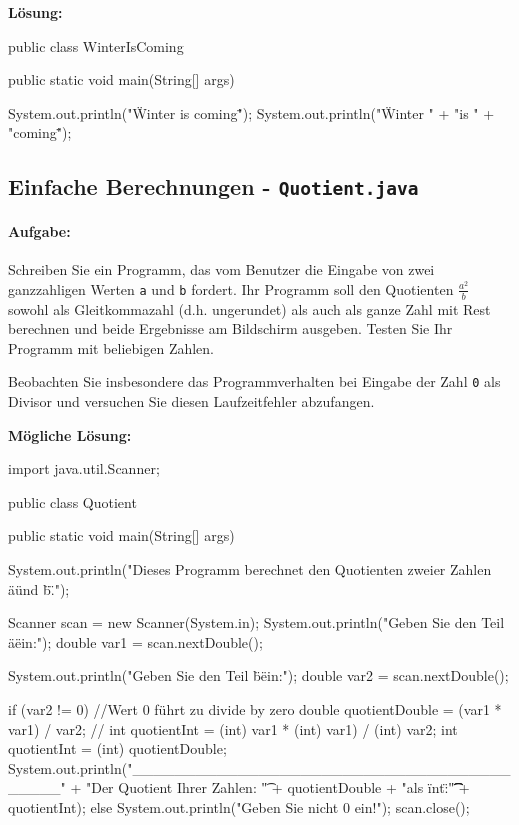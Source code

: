 \documentclass[a4paper,10pt, dvipsnames]{report}
\begin{document}
\textbf{Lösung:}
\begin{javacodebox}
public class WinterIsComing {

    public static void main(String[] args) {

        System.out.println("\"Winter is coming\"");
        System.out.println("\"Winter \n" +
            "is \n" +
            "coming\"");
    }
}
\end{javacodebox}


\subsection{Einfache Berechnungen - \texttt{Quotient.java}}

\paragraph{Aufgabe:}
Schreiben Sie ein Programm, das vom Benutzer die Eingabe von zwei ganzzahligen Werten \texttt{a} und \texttt{b} fordert. Ihr Programm soll den Quotienten $\frac{a^2}{b}$ sowohl als Gleitkommazahl (d.h. ungerundet) als auch als ganze Zahl mit Rest berechnen und beide Ergebnisse am Bildschirm ausgeben. Testen Sie Ihr Programm mit beliebigen Zahlen.

Beobachten Sie insbesondere das Programmverhalten bei Eingabe der Zahl \texttt{0} als Divisor und versuchen Sie diesen Laufzeitfehler abzufangen.

\textbf{Mögliche Lösung:}

\begin{javacodebox}
import java.util.Scanner;

public class Quotient {
    public static void main(String[] args) {

        System.out.println("Dieses Programm berechnet den Quotienten
                            zweier Zahlen \"a\" und \"b\".");
        
        Scanner scan = new Scanner(System.in);
        System.out.println("Geben Sie den Teil \"a\" ein:");
        double var1 = scan.nextDouble();
        
        System.out.println("Geben Sie den Teil \"b\" ein:");
        double var2 = scan.nextDouble();
        
        if (var2 != 0) { //Wert 0 führt zu divide by zero
            double quotientDouble = (var1 * var1) / var2;
            // int quotientInt = (int) var1 * (int) var1) / (int) var2;
            int quotientInt = (int) quotientDouble;
            System.out.println("_________________________________________\n" + 
                "Der Quotient Ihrer Zahlen: \t" + quotientDouble + 
                "\nUnd als \"int\":\t \t \t" + quotientInt);
        } else { 
            System.out.println("Geben Sie nicht 0 ein!");
        }
        scan.close();
    }
}
\end{javacodebox}
\end{document}
